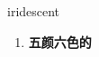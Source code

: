 
\begin{frame}
{\huge iridescent}
\begin{center}
\begin{enumerate}\Large
  \item \textbf{五颜六色的}
\end{enumerate}
\end{center}
\end{frame}
